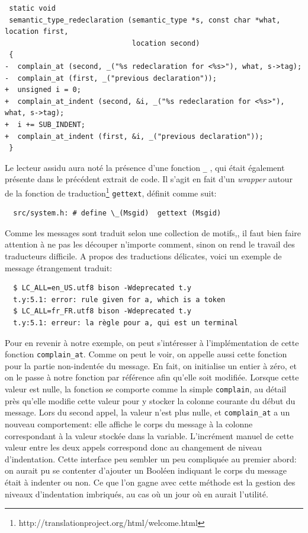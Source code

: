 \documentclass[a4paper,11pt,twoside,final]{article}
\begin{document}
  \begin{verbatim}
 static void
 semantic_type_redeclaration (semantic_type *s, const char *what, location first,
                              location second)
 {
-  complain_at (second, _("%s redeclaration for <%s>"), what, s->tag);
-  complain_at (first, _("previous declaration"));
+  unsigned i = 0;
+  complain_at_indent (second, &i, _("%s redeclaration for <%s>"), what, s->tag);
+  i += SUB_INDENT;
+  complain_at_indent (first, &i, _("previous declaration"));
 }
  \end{verbatim}

  Le lecteur assidu aura noté la présence d'une fonction \og \texttt{\_} \fg,
  qui était également présente dans le précédent extrait de code. Il s'agit en
  fait d'un \textit{wrapper} autour de la fonction de traduction\footnote{%
  http://translationproject.org/html/welcome.html} \texttt{gettext}, définit
  comme suit:

  \begin{verbatim}
  src/system.h: # define \_(Msgid)  gettext (Msgid)
  \end{verbatim}

  Comme les messages sont traduit selon une collection de motifs,, il faut bien
  faire attention à ne pas les découper n'importe comment, sinon on rend le
  travail des traducteurs difficile. A propos des traductions délicates, voici
  un exemple de message étrangement traduit:

  \begin{verbatim}
  $ LC_ALL=en_US.utf8 bison -Wdeprecated t.y
  t.y:5.1: error: rule given for a, which is a token
  $ LC_ALL=fr_FR.utf8 bison -Wdeprecated t.y
  t.y:5.1: erreur: la règle pour a, qui est un terminal
  \end{verbatim}

  Pour en revenir à notre exemple, on peut s'intéresser à l'implémentation de
  cette fonction \texttt{complain\_at}. Comme on peut le voir, on appelle aussi
  cette fonction pour la partie non-indentée du message. En fait, on initialise
  un entier à zéro, et on le passe à notre fonction par référence afin qu'elle
  soit modifiée. Lorsque cette valeur est nulle, la fonction se comporte comme
  la simple \texttt{complain}, au détail près qu'elle modifie cette valeur pour
  y stocker la colonne courante du début du message. Lors du second appel, la
  valeur n'est plus nulle, et \texttt{complain\_at} a un nouveau comportement:
  elle affiche le corps du message  à la colonne correspondant à la valeur
  stockée dans la variable. L'incrément manuel de cette valeur entre les deux
  appels correspond donc au changement de niveau d'indentation. Cette interface
  peu sembler un peu compliquée au premier abord: on aurait pu se contenter
  d'ajouter un Booléen indiquant le corps du message était à indenter ou non.
  Ce que l'on gagne avec cette méthode est la gestion des niveaux d'indentation
  imbriqués, au cas où un jour où en aurait l'utilité.
\end{document}
